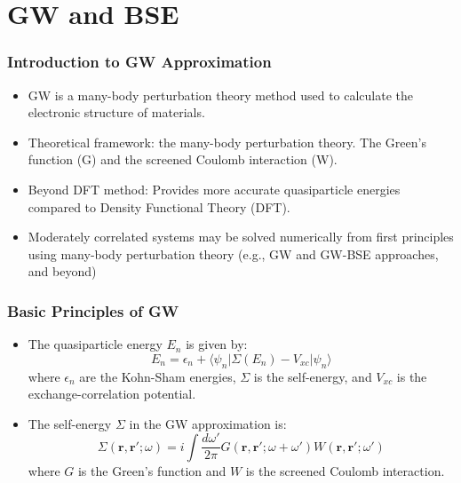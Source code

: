 \documentclass{CustomBeamer}
\begin{document}
    \section{GW and BSE}
    \begin{frame}
        \frametitle{Introduction to GW Approximation}
        \begin{itemize}
            \item GW is a many-body perturbation theory method used to calculate the electronic structure of materials.
            \item Theoretical framework: the many-body perturbation theory. The Green's function (G) and the screened Coulomb interaction (W).
            \item Beyond DFT method: Provides more accurate quasiparticle energies compared to Density Functional Theory (DFT).
            \item         Moderately correlated systems may be solved numerically
                from first principles using many-body perturbation theory
                (e.g., GW and GW-BSE approaches, and beyond)      
        \end{itemize}
        \end{frame}


        \begin{frame}
        \frametitle{Basic Principles of GW}
        \begin{itemize}
            \item The quasiparticle energy $E_n$ is given by:
            \begin{equation}
            E_n = \epsilon_n + \langle \psi_n | \Sigma(E_n) - V_{xc} | \psi_n \rangle
            \end{equation}
            where $\epsilon_n$ are the Kohn-Sham energies, $\Sigma$ is the self-energy, and $V_{xc}$ is the exchange-correlation potential.
            \item The self-energy $\Sigma$ in the GW approximation is:
            \begin{equation}
            \Sigma(\mathbf{r}, \mathbf{r}'; \omega) = i \int \frac{d\omega'}{2\pi} G(\mathbf{r}, \mathbf{r}'; \omega + \omega') W(\mathbf{r}, \mathbf{r}'; \omega')
            \end{equation}
            where $G$ is the Green's function and $W$ is the screened Coulomb interaction.
        \end{itemize}
        \end{frame}
        
\end{document}
